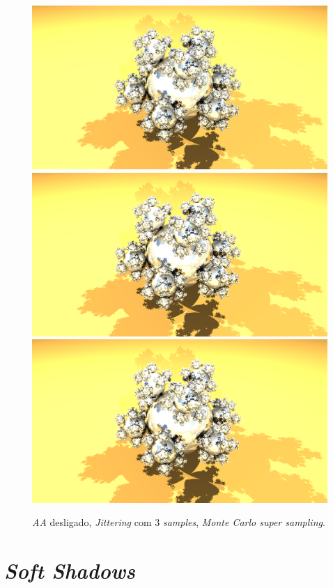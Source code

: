 \documentclass{article}
\begin{document}
        \begin{figure}[h]
            \centering
            \includegraphics[scale=0.08]{aa00}
            \includegraphics[scale=0.08]{aajt}
            \includegraphics[scale=0.08]{aamc}
            \caption{\textit{AA} desligado, \textit{Jittering} com 3 \textit{samples}, \textit{Monte Carlo super sampling}.}
        \end{figure}    

    \section*{\textit{Soft Shadows}}
\end{document}
